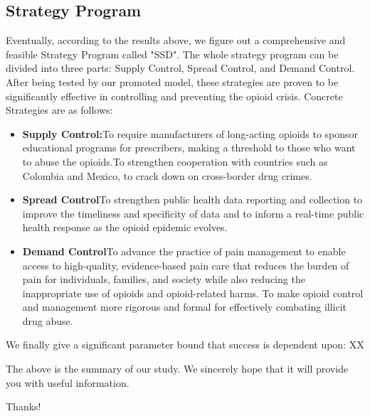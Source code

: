 \documentclass{mcmthesis}
\begin{document}
\subsection*{Strategy Program}
Eventually, according to the results above, we figure out a comprehensive and feasible Strategy Program called "SSD". The whole strategy program can be divided into three parts: Supply Control, Spread Control, and Demand Control. After being tested by our promoted model, these strategies are proven to be significantly effective in controlling and preventing the opioid crisis. Concrete Strategies are as follows:
\begin{itemize}
    \item \textbf{Supply Control:}To require manufacturers of long-acting opioids to sponsor educational programs for prescribers, making a threshold to those who want to abuse the opioids.To strengthen cooperation with countries such as Colombia and Mexico, to crack down on cross-border drug crimes.
    \item \textbf{ Spread Control}To strengthen public health data reporting and collection to improve the timeliness and specificity of data and to inform a real-time public health response as the opioid epidemic evolves.
    \item \textbf{Demand Control}To advance the practice of pain management to enable access to high-quality, evidence-based pain care that reduces the burden of pain for individuals, families, and society while also reducing the inappropriate use of opioids and opioid-related harms. To make opioid control and management more rigorous and formal for effectively combating illicit drug abuse.
\end{itemize}

We finally give a significant parameter bound that success is dependent upon: XX

The above is the summary of our study. We sincerely hope that it will provide you with useful information.

Thanks!

\newpage



	
\ \newpage
\end{document}
